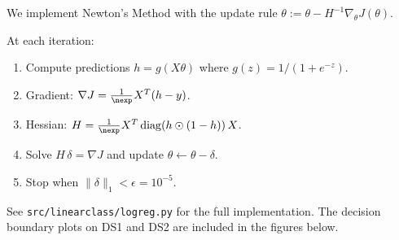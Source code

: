 \begin{answer}
We implement Newton's Method with the update rule $\theta := \theta - H^{-1} \nabla_\theta J(\theta)$.

At each iteration:
\begin{enumerate}
    \item Compute predictions $h = g(X\theta)$ where $g(z) = 1/(1+e^{-z})$.
    \item Gradient: $\nabla J = \frac{1}{\nexp} X^T(h - y)$.
    \item Hessian: $H = \frac{1}{\nexp} X^T \operatorname{diag}(h \odot (1-h))\, X$.
    \item Solve $H\,\delta = \nabla J$ and update $\theta \leftarrow \theta - \delta$.
    \item Stop when $\|\delta\|_1 < \epsilon = 10^{-5}$.
\end{enumerate}

See \texttt{src/linearclass/logreg.py} for the full implementation. The decision boundary plots on DS1 and DS2 are included in the figures below.
\end{answer}
